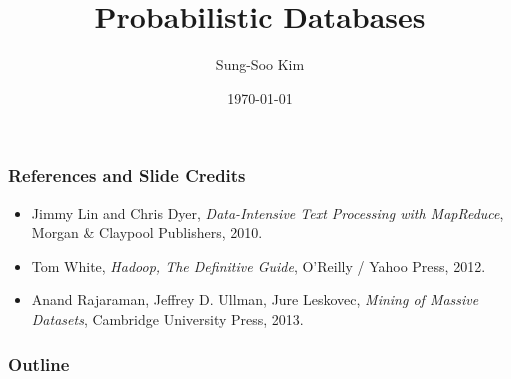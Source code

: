\documentclass{beamer}
\title[Flying KIWI]{Probabilistic Databases} %
\author{Sung-Soo Kim} %
\institute[ETRI] %
{
\textit{sungsoo@etri.re.kr} \\ %
\medskip
Data Management Research Section, ETRI %
}
\date{\today} %
\newcommand{\bi}{\begin{itemize}}
\newcommand{\ei}{\end{itemize}}
\newcommand{\ii}{\item}
\begin{document}
\begin{frame}
\titlepage %
\end{frame}

\begin{frame}
\frametitle{References and Slide Credits}
\bi
\ii Jimmy Lin and Chris Dyer, \textit{Data-Intensive Text Processing with MapReduce}, Morgan \& Claypool Publishers, 2010.
\ii Tom White, \textit{Hadoop, The Definitive Guide}, O'Reilly / Yahoo Press, 2012.
\ii Anand Rajaraman, Jeffrey D. Ullman, Jure Leskovec, \textit{Mining of Massive Datasets}, Cambridge University Press, 2013. 
\ei
\end{frame}

\begin{frame}
\frametitle{Outline} %
\tableofcontents 
\end{frame}

\end{document}
